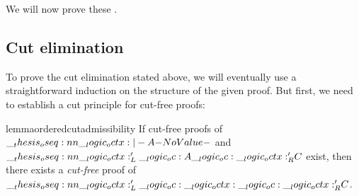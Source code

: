 We will now prove these .











\subsection{Cut elimination}\label{sec:ordered-logic:cut-elimination}

To prove the cut elimination  stated above, we will eventually use a straightforward induction on the structure of the given proof.
But first, we need to establish a cut principle for cut-free proofs:
%
\begin{restatable*}[
  name=Admissibility of cut,
  label=lem:ordered-logic:cut-admissibility
]{lemma}{orderedcutadmissibility}
  If cut-free proofs of\/ $\oseq{\octx |- A}$ and $\oseq{\octx'_L \oc A \oc \octx'_R |- C}$ exist, then there exists a \emph{cut-free} proof of\/ $\oseq{\octx'_L \oc \octx \oc \octx'_R |- C}$.
\end{restatable*}

